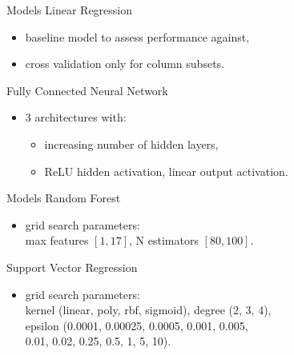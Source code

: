 \documentclass[xcolor=table]{beamer} %
\begin{document}
\begin{frame}{Models}
  \vspace{-0.5cm}
  Linear Regression
  \begin{itemize}
      \item baseline model to assess performance against,
      \item cross validation only for column subsets.
  \end{itemize}
  Fully Connected Neural Network
  \begin{itemize}
      \item 3 architectures with:
        \begin{itemize}
            \item increasing number of hidden layers,
            \item ReLU hidden activation, linear output activation.
        \end{itemize}
  \end{itemize}
\end{frame}

\begin{frame}{Models}
  \vspace{-0.5cm}
  Random Forest
  \begin{itemize}
      \item grid search parameters:\\
      max features $[1, 17]$, N estimators $[80, 100]$.
  \end{itemize}
  Support Vector Regression
  \begin{itemize}
      \item grid search parameters:\\
      kernel (linear, poly, rbf, sigmoid), degree (2, 3, 4),\\epsilon (0.0001, 0.00025, 0.0005, 0.001, 0.005, \\0.01, 0.02, 0.25, 0.5, 1, 5, 10).
  \end{itemize}
\end{frame}
\end{document}

